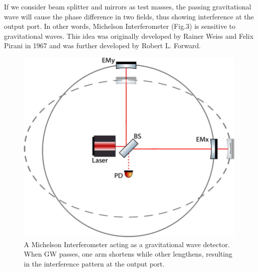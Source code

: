 \documentclass[conference]{IEEEtran}
\begin{document}
If we consider beam splitter and mirrors as test masses, the passing gravitational wave will cause the phase difference in two fields, thus showing interference at the output port. In other words, Michelson Interferometer (Fig.3) is sensitive to gravitational waves. This idea was originally developed by Rainer Weiss and Felix Pirani in 1967 and was further developed by Robert L. Forward.

\begin{figure}[htbp]
\centerline{\includegraphics[scale=0.7]{Simplified-schematic-of-Michelson-interferometer-acting-as-a-gravitational-wave-detector.png}}
\caption{A Michelson Interferometer acting as a gravitational wave detector. When GW passes, one arm shortens while other lengthens, resulting in the interference pattern at the output port\cite{Hammond_2014}.}

\end{figure}
\end{document}
